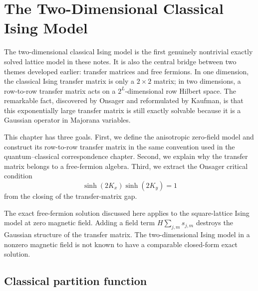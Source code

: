\chapter{The Two-Dimensional Classical Ising Model}
\label{chap:two-dimensional-classical-ising}

The two-dimensional classical Ising model is the first genuinely nontrivial
exactly solved lattice model in these notes.  It is also the central bridge
between two themes developed earlier: transfer matrices and free fermions.  In
one dimension, the classical Ising transfer matrix is only a $2\times2$ matrix;
in two dimensions, a row-to-row transfer matrix acts on a $2^L$-dimensional row
Hilbert space.  The remarkable fact, discovered by Onsager and reformulated by
Kaufman, is that this exponentially large transfer matrix is still exactly
solvable because it is a Gaussian operator in Majorana variables.

This chapter has three goals.  First, we define the anisotropic zero-field model
and construct its row-to-row transfer matrix in the same convention used in the
quantum--classical correspondence chapter.  Second, we explain why the transfer
matrix belongs to a free-fermion algebra.  Third, we extract the Onsager critical
condition
\begin{equation}
\label{eq:2d-classical-ising-onsager-critical-preview}
    \sinh(2K_x)\sinh(2K_y)=1
\end{equation}
from the closing of the transfer-matrix gap.

\begin{remark}
The exact free-fermion solution discussed here applies to the square-lattice
Ising model at zero magnetic field.  Adding a field term
$H\sum_{j,m}s_{j,m}$ destroys the Gaussian structure of the transfer matrix.
The two-dimensional Ising model in a nonzero magnetic field is not known to have
a comparable closed-form exact solution.
\end{remark}

\section{Classical partition function}
\label{sec:2d-classical-ising-partition-function}

